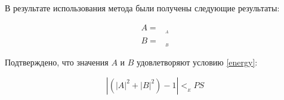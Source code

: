В результате использования метода были получены следующие результаты:

\begin{equation}\label{__METHOD-results}
  \begin{aligned}
    A=&__A \\
    B=&__B
  \end{aligned}
\end{equation}

Подтверждено, что значения $A$ и $B$ удовлетворяют условию \ref{energy}:

\begin{displaymath}
  \left | \left( |A|^2 + |B|^2 \right) - 1 \right | < __EPS
\end{displaymath}
